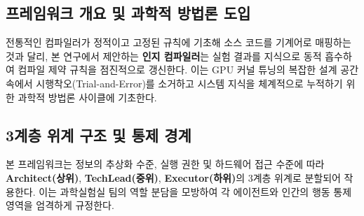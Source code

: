 \documentclass[preprint]{kcc} %
\begin{document}
\subsection{프레임워크 개요 및 과학적 방법론 도입}
전통적인 컴파일러가 정적이고 고정된 규칙에 기초해 소스 코드를 기계어로 매핑하는 것과 달리, 본 연구에서 제안하는 \textbf{인지 컴파일러}는 실험 결과를 지식으로 동적 흡수하여 컴파일 제약 규칙을 점진적으로 갱신한다. 이는 GPU 커널 튜닝의 복잡한 설계 공간 속에서 시행착오(Trial-and-Error)를 소거하고 시스템 지식을 체계적으로 누적하기 위한 과학적 방법론 사이클에 기초한다.

\begin{table}[h]
\centering
\caption{커널 엔지니어링의 과학적 방법론 사이클 매핑}
\end{table}

\subsection{3계층 위계 구조 및 통제 경계}
본 프레임워크는 정보의 추상화 수준, 실행 권한 및 하드웨어 접근 수준에 따라 \textbf{Architect(상위)}, \textbf{TechLead(중위)}, \textbf{Executor(하위)}의 3계층 위계로 분할되어 작용한다. 이는 과학실험실 팀의 역할 분담을 모방하여 각 에이전트와 인간의 행동 통제 영역을 엄격하게 규정한다.
\end{document}
